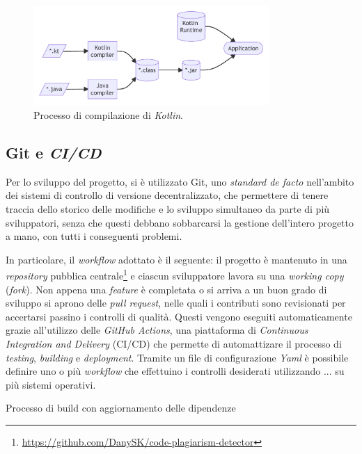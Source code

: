 \begin{figure}[h]
    \centering
    \includegraphics[width=0.8\textwidth]{resources/img/03-kotlincompilation.pdf}
    \caption{Processo di compilazione di \textit{Kotlin}.}
    \label{img:03-kotlin-compilation}
\end{figure}

\subsection*{Git e \textit{CI/CD}}
\label{03-git-ci}
Per lo sviluppo del progetto, si è utilizzato Git, uno \textit{standard de facto} nell'ambito dei sistemi di controllo di versione decentralizzato, che permettere di tenere traccia dello storico delle modifiche e lo sviluppo simultaneo da parte di più sviluppatori, senza che questi debbano sobbarcarsi la gestione dell'intero progetto a mano, con tutti i conseguenti problemi.

In particolare, il \textit{workflow} adottato è il seguente: il progetto è mantenuto in una \textit{repository} pubblica centrale\footnote{\url{https://github.com/DanySK/code-plagiarism-detector}} e ciascun sviluppatore lavora su una \textit{working copy} (\textit{fork}).
%
Non appena una \textit{feature} è completata o si arriva a un buon grado di sviluppo si aprono delle \textit{pull request}, nelle quali i contributi sono revisionati per accertarsi passino i controlli di qualità.
%
Questi vengono eseguiti automaticamente grazie all'utilizzo delle \textit{GitHub Actions}, una piattaforma di \textit{Continuous Integration and Delivery} (CI/CD) che permette di automattizare il processo di \textit{testing}, \textit{building} e \textit{deployment}.
%
Tramite un file di configurazione \textit{Yaml} è possibile definire uno o più \textit{workflow} che effettuino i controlli desiderati utilizzando ... su più sistemi operativi.

Processo di build con aggiornamento delle dipendenze

